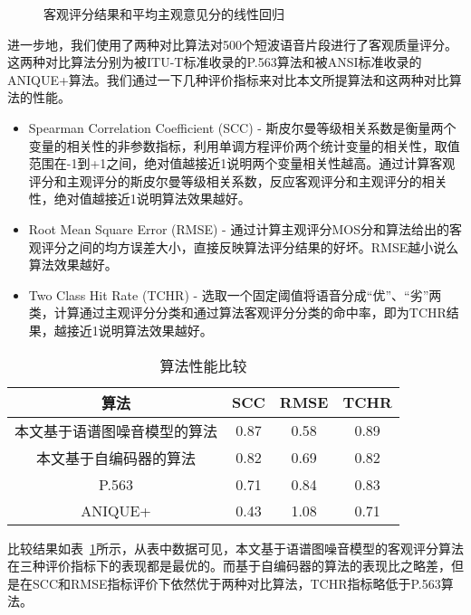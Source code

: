 \begin{figure}
\centering
{}
\caption{客观评分结果和平均主观意见分的线性回归\label{fig:regress}}
\end{figure}

进一步地，我们使用了两种对比算法对500个短波语音片段进行了客观质量评分。这两种对比算法分别为被ITU-T标准收录的P.563算法和被ANSI标准收录的ANIQUE+算法。我们通过一下几种评价指标来对比本文所提算法和这两种对比算法的性能。

\begin{itemize}
\item Spearman Correlation Coefficient (SCC) - 斯皮尔曼等级相关系数是衡量两个变量的相关性的非参数指标，利用单调方程评价两个统计变量的相关性，取值范围在-1到+1之间，绝对值越接近1说明两个变量相关性越高。通过计算客观评分和主观评分的斯皮尔曼等级相关系数，反应客观评分和主观评分的相关性，绝对值越接近1说明算法效果越好。
\item Root Mean Square Error (RMSE) - 通过计算主观评分MOS分和算法给出的客观评分之间的均方误差大小，直接反映算法评分结果的好坏。RMSE越小说么算法效果越好。
\item Two Class Hit Rate (TCHR) - 选取一个固定阈值将语音分成“优”、“劣”两类，计算通过主观评分分类和通过算法客观评分分类的命中率，即为TCHR结果，越接近1说明算法效果越好。
\end{itemize}

\begin{table}
\centering
\caption{算法性能比较}
\label{tab:alg-compare}
\begin{tabular}{cccc}
\toprule[1.5pt]
算法 & SCC & RMSE & TCHR \\ \midrule[1pt]
本文基于语谱图噪音模型的算法 & 0.87 & 0.58 & 0.89 \\
本文基于自编码器的算法 & 0.82 & 0.69 & 0.82 \\
P.563 & 0.71 & 0.84 & 0.83 \\
ANIQUE+ & 0.43 & 1.08 & 0.71 \\
\end{tabular}
\end{table}

比较结果如表~\ref{tab:alg-compare}所示，从表中数据可见，本文基于语谱图噪音模型的客观评分算法在三种评价指标下的表现都是最优的。而基于自编码器的算法的表现比之略差，但是在SCC和RMSE指标评价下依然优于两种对比算法，TCHR指标略低于P.563算法。


